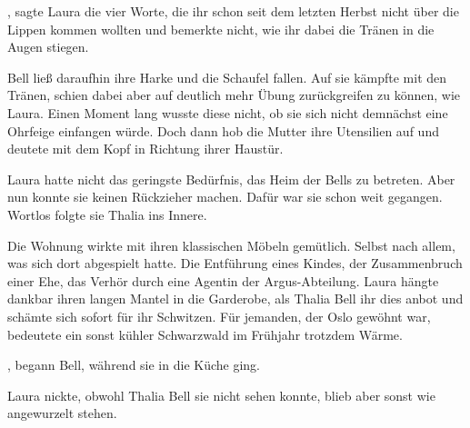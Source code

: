 \par

, sagte Laura die vier Worte, die ihr schon seit dem letzten Herbst nicht über die Lippen kommen wollten und bemerkte nicht, wie ihr dabei die Tränen in die Augen stiegen.

\par

Bell ließ daraufhin ihre Harke und die Schaufel fallen. Auf sie kämpfte mit den Tränen, schien dabei aber auf deutlich mehr Übung zurückgreifen zu können, wie Laura. Einen Moment lang wusste diese nicht, ob sie sich nicht demnächst eine Ohrfeige einfangen würde. Doch dann hob die Mutter ihre Utensilien auf und deutete mit dem Kopf in Richtung ihrer Haustür.

\par

Laura hatte nicht das geringste Bedürfnis, das Heim der Bells zu betreten. Aber nun konnte sie keinen Rückzieher machen. Dafür war sie schon weit gegangen. Wortlos folgte sie Thalia ins Innere.

\par

Die Wohnung wirkte mit ihren klassischen Möbeln gemütlich. Selbst nach allem, was sich dort abgespielt hatte. Die Entführung eines Kindes, der Zusammenbruch einer Ehe, das Verhör durch eine Agentin der Argus-Abteilung. Laura hängte dankbar ihren langen Mantel in die Garderobe, als Thalia Bell ihr dies anbot und schämte sich sofort für ihr Schwitzen. Für jemanden, der Oslo gewöhnt war, bedeutete ein sonst kühler Schwarzwald im Frühjahr trotzdem Wärme.

\par

, begann Bell, während sie in die Küche ging. 

\par

Laura nickte, obwohl Thalia Bell sie nicht sehen konnte, blieb aber sonst wie angewurzelt stehen.

\par


